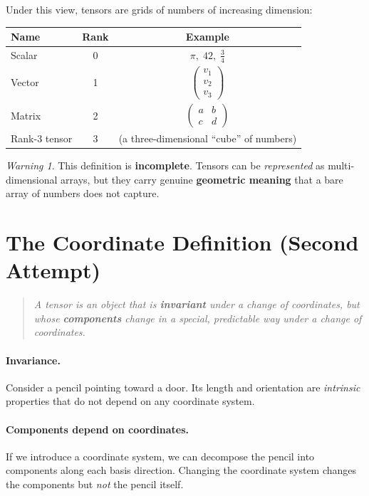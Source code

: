 \documentclass[12pt, a4paper]{report}
\theoremstyle{definition}
\theoremstyle{plain}
\theoremstyle{remark}
\newtheorem{warning}{Warning}[chapter]
\begin{document}
Under this view, tensors are grids of numbers of increasing dimension:
\begin{center}
\renewcommand{\arraystretch}{1.3}
\begin{tabular}{lcc}
    \toprule
    \textbf{Name} & \textbf{Rank} & \textbf{Example} \\
    \midrule
    Scalar   & 0 & $\pi,\; 42,\; \tfrac{3}{4}$ \\
    Vector   & 1 & $\begin{pmatrix} v_1 \\ v_2 \\ v_3 \end{pmatrix}$ \\
    Matrix   & 2 & $\begin{pmatrix} a & b \\ c & d \end{pmatrix}$ \\
    Rank-3 tensor & 3 & (a three-dimensional ``cube'' of numbers) \\
    \bottomrule
\end{tabular}
\end{center}

\begin{warning}
This definition is \textbf{incomplete}.  Tensors can be \emph{represented} as
multi-dimensional arrays, but they carry genuine \textbf{geometric meaning} that a
bare array of numbers does not capture.
\end{warning}

\section{The Coordinate Definition (Second Attempt)}

\begin{quote}
    \emph{A tensor is an object that is \textbf{invariant} under a change of
    coordinates, but whose \textbf{components} change in a special, predictable way
    under a change of coordinates.}
\end{quote}

\paragraph{Invariance.}
Consider a pencil pointing toward a door.  Its length and orientation are
\emph{intrinsic} properties that do not depend on any coordinate system.

\paragraph{Components depend on coordinates.}
If we introduce a coordinate system, we can decompose the pencil into components
along each basis direction.  Changing the coordinate system changes the components
but \emph{not} the pencil itself.
\end{document}
